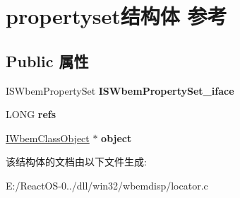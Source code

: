 \hypertarget{structpropertyset}{}\section{propertyset结构体 参考}
\label{structpropertyset}
\subsection*{Public 属性}
\begin{DoxyCompactItemize}
\item 
\mbox{\label{structpropertyset_ac0500e0ec54c856d77fbebbfdeeae949}} 
I\+S\+Wbem\+Property\+Set {\bfseries I\+S\+Wbem\+Property\+Set\+\_\+iface}
\item 
\mbox{\label{structpropertyset_a485f3aa6abf613ca725ef4007a4d3e4f}} 
L\+O\+NG {\bfseries refs}
\item 
\mbox{\label{structpropertyset_a83b6c3131e4ea672d204fd8f1c12c29f}} 
\hyperlink{interface_i_wbem_class_object}{I\+Wbem\+Class\+Object} $\ast$ {\bfseries object}
\end{DoxyCompactItemize}


该结构体的文档由以下文件生成\+:\begin{DoxyCompactItemize}
\item 
E\+:/\+React\+O\+S-\/0../dll/win32/wbemdisp/locator.\+c\end{DoxyCompactItemize}
